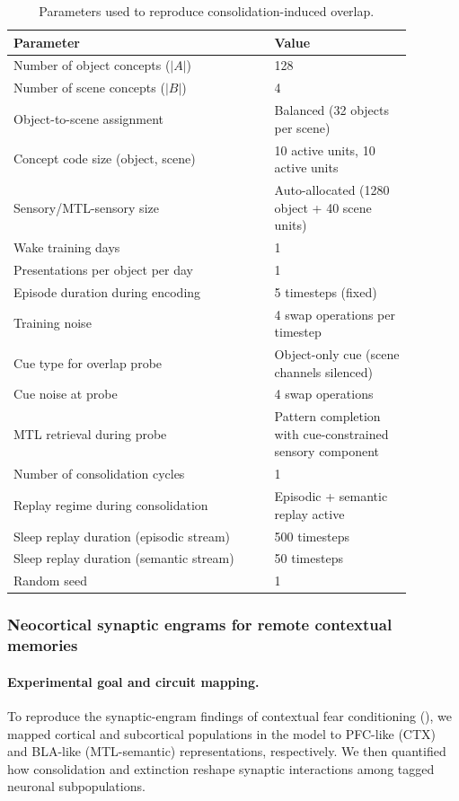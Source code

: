 \documentclass{article}
\begin{document}
\begin{table}[ht]
\centering
\caption{Parameters used to reproduce consolidation-induced overlap.}
\label{tab:overlap_reproduction_parameters}
\begin{tabular}{p{0.58\linewidth}p{0.30\linewidth}}
\toprule
\textbf{Parameter} & \textbf{Value} \\
\midrule
Number of object concepts ($|A|$) & 128 \\
Number of scene concepts ($|B|$) & 4 \\
Object-to-scene assignment & Balanced (32 objects per scene) \\
Concept code size (object, scene) & 10 active units, 10 active units \\
Sensory/MTL-sensory size & Auto-allocated (1280 object + 40 scene units) \\
Wake training days & 1 \\
Presentations per object per day & 1 \\
Episode duration during encoding & 5 timesteps (fixed) \\
Training noise & 4 swap operations per timestep \\
Cue type for overlap probe & Object-only cue (scene channels silenced) \\
Cue noise at probe & 4 swap operations \\
MTL retrieval during probe & Pattern completion with cue-constrained sensory component \\
Number of consolidation cycles & 1 \\
Replay regime during consolidation & Episodic + semantic replay active \\
Sleep replay duration (episodic stream) & 500 timesteps \\
Sleep replay duration (semantic stream) & 50 timesteps \\
Random seed & 1 \\
\bottomrule
\end{tabular}
\end{table}

\subsubsection*{Neocortical synaptic engrams for remote contextual memories }

\paragraph{Experimental goal and circuit mapping.}
To reproduce the synaptic-engram findings of contextual fear conditioning (), we mapped cortical and subcortical populations in the model to PFC-like (CTX) and BLA-like (MTL-semantic) representations, respectively. We then quantified how consolidation and extinction reshape synaptic interactions among tagged neuronal subpopulations.
\end{document}
